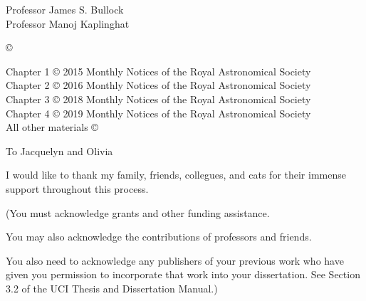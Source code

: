




\othercommitteemembers
{
  Professor James S. Bullock\\
  Professor Manoj Kaplinghat
}


\copyrightdeclaration
{
  {\copyright} {\Degreeyear} \Authorname
}

 \prepublishedcopyrightdeclaration
 {
 	Chapter 1 {\copyright} 2015 Monthly Notices of the Royal
        Astronomical Society \\
        Chapter 2 {\copyright} 2016 Monthly Notices of the Royal
        Astronomical Society \\
        Chapter 3 {\copyright} 2018 Monthly Notices of the Royal
        Astronomical Society \\
        Chapter 4 {\copyright} 2019 Monthly Notices of the Royal
        Astronomical Society \\
 	All other materials {\copyright} {\Degreeyear} \Authorname
 }

\dedications
{ 
  To Jacquelyn and Olivia
}

\acknowledgments
{
  I would like to thank my family, friends, collegues, and cats for
  their immense support throughout this process.
  
  (You must acknowledge grants and other funding assistance. 
  
  You may also acknowledge the contributions of professors and
  friends.
  
  You also need to acknowledge any publishers of your previous
  work who have given you permission to incorporate that work
  into your dissertation. See Section 3.2 of the UCI Thesis and
  Dissertation Manual.)
}


